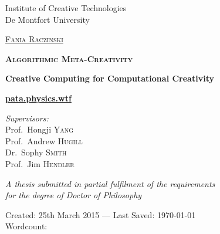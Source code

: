 
\begin{titlingpage}
\begin{center}

Institute of Creative Technologies\\
De Montfort University

\vspace{1cm}

\textsc{\huge \href{http://fania.uk}{Fania Raczinski}}

\vspace{1.5cm}


\textsc{\bfseries\scshape\sffamily \fontsize{40}{30}\selectfont Algorithmic Meta-Creativity}

\vspace{1cm}

{\huge \bfseries Creative Computing for Computational Creativity}

\vspace{1cm}
{\Huge \textbf{\url{pata.physics.wtf}}}
\vspace{1.5cm}

\emph{Supervisors:}\\
{Prof.\ Hongji \textsc{Yang}}\\
{Prof.\ Andrew \textsc{Hugill}}\\
{Dr.\ Sophy \textsc{Smith}}\\
{Prof.\ Jim \textsc{Hendler}}

\vspace{1.5cm}

\large \textit{A thesis submitted in partial fulfilment of the requirements\\ for the degree of Doctor of Philosophy}

\vfill

Created: {25th March 2015} --- Last Saved: {\today}\\
Wordcount: \wordcount

\end{center}
\end{titlingpage}
